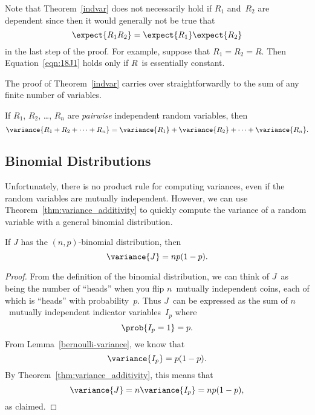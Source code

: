 Note that Theorem~\ref{indvar} does not necessarily hold if $R_1$
and~$R_2$ are dependent since then it would generally not be true that
\begin{equation}\label{eqn:18J1}
    \expect{R_1 R_2} = \expect{R_1} \expect{R_2}
\end{equation}
in the last step of the proof.  For example, suppose that $R_1 = R_2 =
R$.  Then Equation~\ref{eqn:18J1} holds only if $R$~is essentially
constant.

The proof of Theorem~\ref{indvar} carries over straightforwardly to
the sum of any finite number of variables.

\begin{theorem}
\label{thm:variance_additivity}
If $R_1$, $R_2$, \dots, $R_n$ are \emph{pairwise} independent random
variables, then
\begin{equation}\label{vsum}
\variance{R_1 + R_2 + \cdots + R_n} = \variance{R_1} + \variance{R_2} +
  \cdots + \variance{R_n}.
\end{equation}
\end{theorem}

\subsection{Binomial Distributions}

Unfortunately, there is no product rule for computing variances, even
if the random variables are mutually independent.  However, we can use
Theorem~\ref{thm:variance_additivity} to quickly compute the variance
of a random variable with a general binomial distribution.

\begin{lemma}
\label{lem:binomial_variance}
If $J$ has the $(n,p)$-binomial distribution, then
\begin{equation}\label{p1p}
\variance{J} = n p (1-p).
\end{equation}
\end{lemma}

\begin{proof}

From the definition of the binomial distribution, we can think of
$J$~as being the number of ``heads'' when you flip $n$~mutually
independent coins, each of which is ``heads'' with probability~$p$.
Thus $J$~can be expressed as the sum of $n$~mutually independent
indicator variables~$I_p$ where
\begin{equation*}
    \prob{I_p = 1} = p.
\end{equation*}
From Lemma~\ref{bernoulli-variance}, we know that
\begin{equation*}
    \variance{I_p} = p (1 - p).
\end{equation*}
By Theorem~\ref{thm:variance_additivity}, this means that
\begin{equation*}
    \variance{J} = n \variance{I_p} = n p (1 - p),
\end{equation*}
as claimed.
\end{proof}

